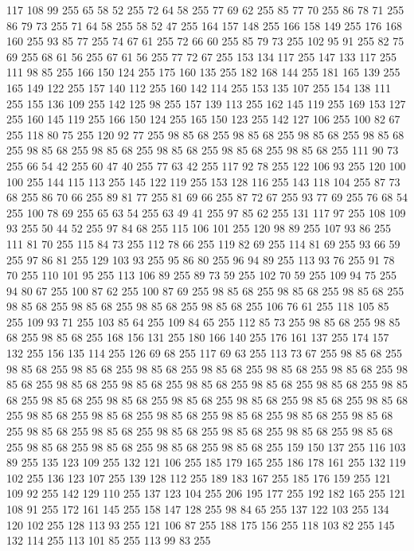 117 108 99 255 65 58 52 255 72 64 58 255 77 69 62 255 85 77 70 255 86 78 71 255 86 79 73 255 71 64 58 255 58 52 47 255 164 157 148 255 166 158 149 255 176 168 160 255 93 85 77 255 74 67 61 255 72 66 60 255 85 79 73 255 102 95 91 255 82 75 69 255 68 61 56 255 67 61 56 255 77 72 67 255 153 134 117 255 147 133 117 255 111 98 85 255 166 150 124 255 175 160 135 255 182 168 144 255 181 165 139 255 165 149 122 255 157 140 112 255 160 142 114 255 153 135 107 255 154 138 111 255 155 136 109 255 142 125 98 255 157 139 113 255 162 145 119 255 169 153 127 255 160 145 119 255 166 150 124 255 165 150 123 255 142 127 106 255 100 82 67 255 118 80 75 255 120 92 77 255 98 85 68 255 98 85 68 255 98 85 68 255 98 85 68 255 98 85 68 255 98 85 68 255 98 85 68 255 98 85 68 255 98 85 68 255 111 90 73 255 66 54 42 255 60 47 40 255 77 63 42 255 117 92 78 255 122 106 93 255 120 100 100 255 144 115 113 255 145 122 119 255 153 128 116 255
143 118 104 255 87 73 68 255 86 70 66 255 89 81 77 255 81 69 66 255 87 72 67 255 93 77 69 255 76 68 54 255 100 78 69 255 65 63 54 255 63 49 41 255 97 85 62 255 131 117 97 255 108 109 93 255 50 44 52 255 97 84 68 255 115 106 101 255 120 98 89 255 107 93 86 255 111 81 70 255 115 84 73 255 112 78 66 255 119 82 69 255 114 81 69 255 93 66 59 255 97 86 81 255 129 103 93 255 95 86 80 255 96 94 89 255 113 93 76 255 91 78 70 255 110 101 95 255 113 106 89 255 89 73 59 255 102 70 59 255 109 94 75 255 94 80 67 255 100 87 62 255 100 87 69 255 98 85 68 255 98 85 68 255 98 85 68 255 98 85 68 255 98 85 68 255 98 85 68 255 98 85 68 255 106 76 61 255 118 105 85 255 109 93 71 255 103 85 64 255 109 84 65 255 112 85 73 255 98 85 68 255 98 85 68 255 98 85 68 255 168 156 131 255 180 166 140 255 176 161 137 255 174 157 132 255 156 135 114 255 126 69 68 255 117 69 63 255 113 73 67 255 98 85 68 255
98 85 68 255 98 85 68 255 98 85 68 255 98 85 68 255 98 85 68 255 98 85 68 255 98 85 68 255 98 85 68 255 98 85 68 255 98 85 68 255 98 85 68 255 98 85 68 255 98 85 68 255 98 85 68 255 98 85 68 255 98 85 68 255 98 85 68 255 98 85 68 255 98 85 68 255 98 85 68 255 98 85 68 255 98 85 68 255 98 85 68 255 98 85 68 255 98 85 68 255 98 85 68 255 98 85 68 255 98 85 68 255 98 85 68 255 98 85 68 255 98 85 68 255 98 85 68 255 98 85 68 255 98 85 68 255 98 85 68 255 159 150 137 255 116 103 89 255 135 123 109 255 132 121 106 255 185 179 165 255 186 178 161 255 132 119 102 255 136 123 107 255 139 128 112 255 189 183 167 255 185 176 159 255 121 109 92 255 142 129 110 255 137 123 104 255 206 195 177 255 192 182 165 255 121 108 91 255 172 161 145 255 158 147 128 255 98 84 65 255 137 122 103 255 134 120 102 255 128 113 93 255 121 106 87 255 188 175 156 255 118 103 82 255 145 132 114 255 113 101 85 255 113 99 83 255
